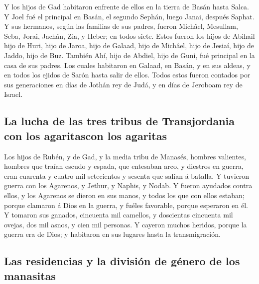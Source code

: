  Y los hijos de Gad habitaron enfrente de ellos en la
tierra de Basán hasta Salca.  Y Joel fué el principal en
Basán, el segundo Sephán, luego Janai, después Saphat.  Y
sus hermanos, según las familias de sus padres, fueron Michâel,
Mesullam, Seba, Jorai, Jachân, Zia, y Heber; en todos siete.
 Estos fueron los hijos de Abihail hijo de Huri, hijo de
Jaroa, hijo de Galaad, hijo de Michâel, hijo de Jesiaí, hijo de Jaddo,
hijo de Buz.  También Ahí, hijo de Abdiel, hijo de Guni,
fué principal en la casa de sus padres.  Los cuales
habitaron en Galaad, en Basán, y en sus aldeas, y en todos los ejidos de
Sarón hasta salir de ellos.  Todos estos fueron contados
por sus generaciones en días de Jothán rey de Judá, y en días de
Jeroboam rey de Israel.

\hypertarget{la-lucha-de-las-tres-tribus-de-transjordania-con-los-agaritascon-los-agaritas}{%
\subsection{La lucha de las tres tribus de Transjordania con los
agaritascon los
agaritas}\label{la-lucha-de-las-tres-tribus-de-transjordania-con-los-agaritascon-los-agaritas}}

 Los hijos de Rubén, y de Gad, y la media tribu de
Manasés, hombres valientes, hombres que traían escudo y espada, que
entesaban arco, y diestros en guerra, eran cuarenta y cuatro mil
setecientos y sesenta que salían á batalla.  Y tuvieron
guerra con los Agarenos, y Jethur, y Naphis, y Nodab.  Y
fueron ayudados contra ellos, y los Agarenos se dieron en sus manos, y
todos los que con ellos estaban; porque clamaron á Dios en la guerra, y
fuéles favorable, porque esperaron en él.  Y tomaron sus
ganados, cincuenta mil camellos, y doscientas cincuenta mil ovejas, dos
mil asnos, y cien mil personas.  Y cayeron muchos
heridos, porque la guerra era de Dios; y habitaron en sus lugares hasta
la transmigración.

\hypertarget{las-residencias-y-la-divisiuxf3n-de-guxe9nero-de-los-manasitas}{%
\subsection{Las residencias y la división de género de los
manasitas}\label{las-residencias-y-la-divisiuxf3n-de-guxe9nero-de-los-manasitas}}

